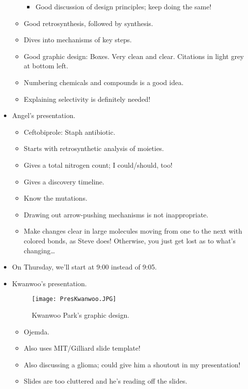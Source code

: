 \documentclass[../notes.tex]{subfiles}
\begin{document}
\begin{itemize}
\begin{itemize}
        \begin{itemize}
            \item Good discussion of design principles; keep doing the same!
        \end{itemize}
        \item Good retrosynthesis, followed by synthesis.
        \item Dives into mechanisms of key steps.
        \item Good graphic design: Boxes. Very clean and clear. Citations in light grey at bottom left.
        \item Numbering chemicals and compounds is a good idea.
        \item Explaining selectivity is definitely needed!
    \end{itemize}
    \item Angel's presentation.
    \begin{itemize}
        \item Ceftobiprole: Staph antibiotic.
        \item Starts with retrosynthetic analysis of moieties.
        \item Gives a total nitrogen count; I could/should, too!
        \item Gives a discovery timeline.
        \item Know the mutations.
        \item Drawing out arrow-pushing mechanisms is not inappropriate.
        \item Make changes clear in large molecules moving from one to the next with colored bonds, as Steve does! Otherwise, you just get lost as to what's changing\dots
    \end{itemize}
    \item On Thursday, we'll start at 9:00 instead of 9:05.
    \item Kwanwoo's presentation.
    \begin{figure}[H]
        \centering
        \texttt{[image: PresKwanwoo.JPG]}
        \caption{Kwanwoo Park's graphic design.}
        \label{fig:PresKwanwoo}
    \end{figure}
    \begin{itemize}
        \item Ojemda.
        \item Also uses MIT/Gilliard slide template!
        \item Also discussing a glioma; could give him a shoutout in my presentation!
        \item Slides are too cluttered and he's reading off the slides.

\end{itemize}
\end{itemize}
\end{document}
